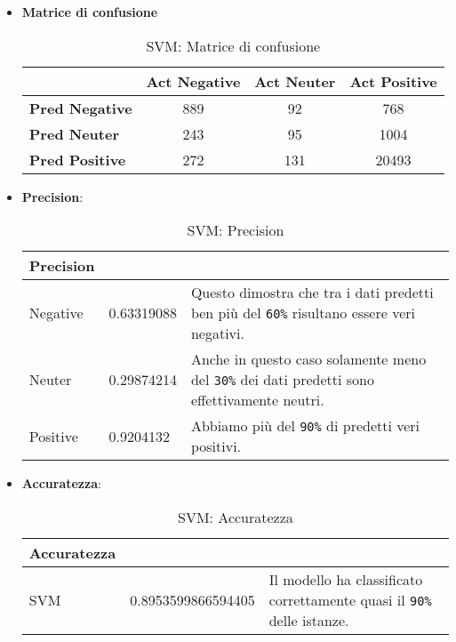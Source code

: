 			\begin{itemize}
				\item \textbf{Matrice di confusione}
				
				\begin{table} [H]
					\caption{SVM: Matrice di confusione}
					\label{tab:matriceConfusioneSVM}
					\centering
					\begin{tabular}{lccc}
						\toprule 
						& \textbf{Act Negative} & \textbf{Act Neuter}	& \textbf{Act Positive}\\
						\midrule
						\textbf{Pred Negative}  & 889 & 92 & 768\\
						\textbf{Pred Neuter} & 243 & 95 & 1004\\
						\textbf{Pred Positive} & 272 & 131 & 20493\\
						\bottomrule
					\end{tabular}
				\end{table}
				
				\item \textbf{Precision}:				
				\begin{table} [H]
					\caption{SVM: Precision}
					\label{tab:precisionSVM}
					\centering
					\begin{tabular}{llp{}}
						\toprule 
						\textbf{Precision}	\\
						\midrule
						Negative  & 0.63319088  & Questo dimostra che tra i dati predetti ben più del \verb|60%| risultano essere veri negativi.\\
						Neuter & 0.29874214 & Anche in questo caso solamente meno del \verb|30%| dei dati predetti sono effettivamente neutri.\\
						Positive & 0.9204132 & Abbiamo più del \verb|90%| di predetti veri positivi.\\
						\bottomrule
					\end{tabular}
				\end{table}
				
				\item \textbf{Accuratezza}: 
								
				\begin{table}[H]
					\caption{SVM: Accuratezza}
					\label{tab:accSVM}
					\centering
					\begin{tabular}{llp{}}
						\toprule 
						\textbf{Accuratezza}	\\
						\midrule
						SVM  & 0.8953599866594405 & Il modello ha classificato correttamente quasi il \verb|90%| delle istanze.\\
						\bottomrule
					\end{tabular}
				\end{table}
				

\end{itemize}
